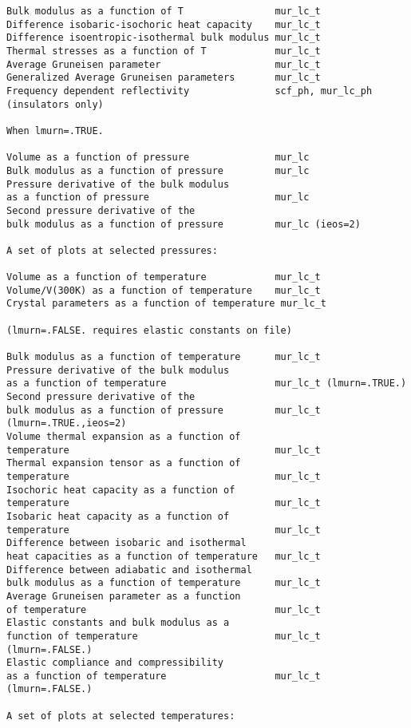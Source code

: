 \documentclass[12pt,a4paper,twoside]{report}
\begin{document}
\begin{footnotesize}
\begin{verbatim}
Bulk modulus as a function of T                mur_lc_t
Difference isobaric-isochoric heat capacity    mur_lc_t
Difference isoentropic-isothermal bulk modulus mur_lc_t
Thermal stresses as a function of T            mur_lc_t
Average Gruneisen parameter                    mur_lc_t
Generalized Average Gruneisen parameters       mur_lc_t     
Frequency dependent reflectivity               scf_ph, mur_lc_ph
(insulators only)

When lmurn=.TRUE.

Volume as a function of pressure               mur_lc
Bulk modulus as a function of pressure         mur_lc
Pressure derivative of the bulk modulus 
as a function of pressure                      mur_lc
Second pressure derivative of the
bulk modulus as a function of pressure         mur_lc (ieos=2)

A set of plots at selected pressures:

Volume as a function of temperature            mur_lc_t
Volume/V(300K) as a function of temperature    mur_lc_t
Crystal parameters as a function of temperature mur_lc_t

(lmurn=.FALSE. requires elastic constants on file)

Bulk modulus as a function of temperature      mur_lc_t
Pressure derivative of the bulk modulus        
as a function of temperature                   mur_lc_t (lmurn=.TRUE.)
Second pressure derivative of the              
bulk modulus as a function of pressure         mur_lc_t (lmurn=.TRUE.,ieos=2)
Volume thermal expansion as a function of             
temperature                                    mur_lc_t
Thermal expansion tensor as a function of             
temperature                                    mur_lc_t
Isochoric heat capacity as a function of       
temperature                                    mur_lc_t
Isobaric heat capacity as a function of        
temperature                                    mur_lc_t
Difference between isobaric and isothermal     
heat capacities as a function of temperature   mur_lc_t
Difference between adiabatic and isothermal     
bulk modulus as a function of temperature      mur_lc_t
Average Gruneisen parameter as a function     
of temperature                                 mur_lc_t
Elastic constants and bulk modulus as a 
function of temperature                        mur_lc_t (lmurn=.FALSE.)
Elastic compliance and compressibility
as a function of temperature                   mur_lc_t (lmurn=.FALSE.)

A set of plots at selected temperatures:


\end{verbatim}
\end{footnotesize}
\end{document}
